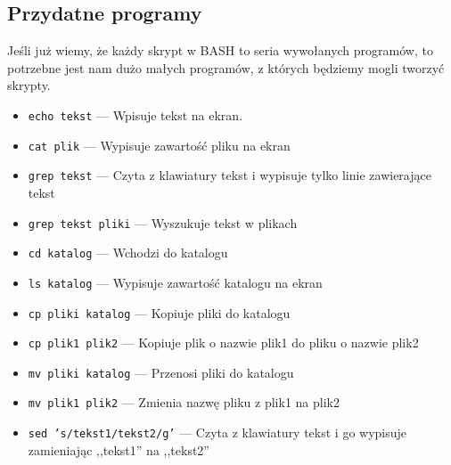 \documentclass{instrukcja}
\begin{document}
\subsection{Przydatne programy}
Jeśli już wiemy, że każdy skrypt w BASH to seria wywołanych programów, to potrzebne jest nam dużo małych programów, z których będziemy mogli tworzyć skrypty.
\begin{itemize}
\item {\tt{\red echo} {\green tekst}} --- Wpisuje {\green tekst} na ekran.
\item {\tt{\red cat} {\green plik}} --- Wypisuje zawartość {\green plik}u na ekran
\item {\tt{\red grep} {\green tekst}} --- Czyta z klawiatury tekst i wypisuje tylko linie zawierające {\green tekst}
\item {\tt{\red grep} {\green tekst pliki}} --- Wyszukuje {\green tekst} w {\green plik}ach
\item {\tt{\red cd} {\green katalog}} --- Wchodzi do {\green katalogu}
\item {\tt{\red ls} {\green katalog}} --- Wypisuje zawartość {\green katalog}u na ekran
\item {\tt{\red cp} {\green pliki katalog}} --- Kopiuje {\green pliki} do {\green katalog}u
\item {\tt{\red cp} {\green plik1 plik2}} --- Kopiuje plik o nazwie {\green plik1} do pliku o nazwie {\green plik2}
\item {\tt{\red mv} {\green pliki katalog}} --- Przenosi {\green pliki} do {\green katalog}u
\item {\tt{\red mv} {\green plik1 plik2}} --- Zmienia nazwę pliku z {\green plik1} na {\green plik2}
\item {\tt{\red sed} {\green 's/tekst1/tekst2/g'}} --- Czyta z klawiatury tekst i go wypisuje zamieniając ,,{\green tekst1}'' na ,,{\green tekst2}''
\end{itemize}
\end{document}
